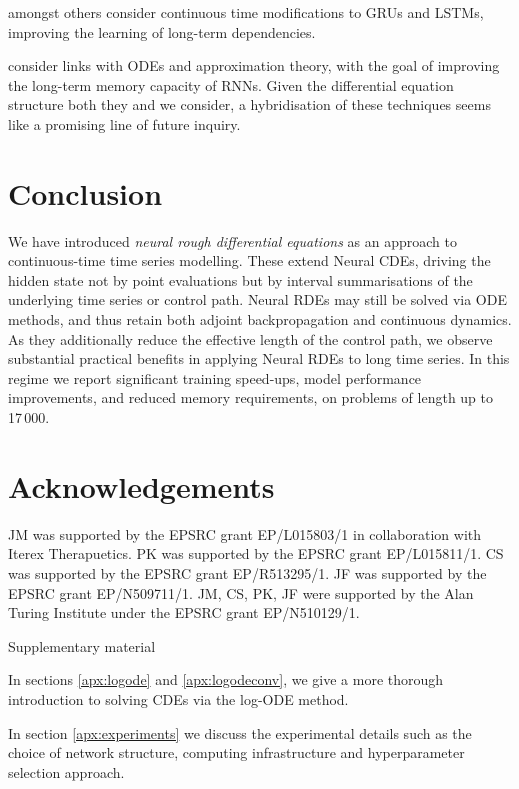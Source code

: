 \documentclass{article}
\begin{document}
\citet{de2019gru, lechner2020learning} amongst others consider continuous time modifications to GRUs and LSTMs, improving the learning of long-term dependencies.

\citet{lmu, hippo} consider links with ODEs and approximation theory, with the goal of improving the long-term memory capacity of RNNs. Given the differential equation structure both they and we consider, a hybridisation of these techniques seems like a promising line of future inquiry. 
\section{Conclusion}
We have introduced \textit{neural rough differential equations} as an approach to continuous-time time series modelling. These extend Neural CDEs, driving the hidden state not by point evaluations but by interval summarisations of the underlying time series or control path. Neural RDEs may still be solved via ODE methods, and thus retain both adjoint backpropagation and continuous dynamics. As they additionally reduce the effective length of the control path, we observe substantial practical benefits in applying Neural RDEs to long time series. In this regime we report significant training speed-ups, model performance improvements, and reduced memory requirements, on problems of length up to 17\,000. 
\section*{Acknowledgements} JM was supported by the EPSRC grant EP/L015803/1 in collaboration with Iterex Therapuetics. PK was supported by the EPSRC grant EP/L015811/1. CS was supported by the EPSRC grant EP/R513295/1. JF was supported by the EPSRC grant EP/N509711/1. JM, CS, PK, JF were supported by the Alan Turing Institute under the EPSRC grant EP/N510129/1.







\newpage
\onecolumn
\appendix
\begin{center}
	\huge Supplementary material
\end{center}
	
In sections \ref{apx:logode} and \ref{apx:logodeconv}, we give a more thorough introduction to solving CDEs via the log-ODE method.

In section \ref{apx:experiments} we discuss the experimental details such as the choice of network structure, computing infrastructure and hyperparameter selection approach.
\end{document}
